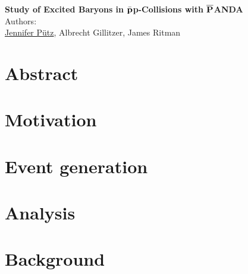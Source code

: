 \documentclass[a4paper, 11pt, twoside]{scrreprt}
\begin{document}
	\pagestyle{fancy}
	\begin{titlepage}
		\thispagestyle{empty}
		\begin{center}
			\textbf{\Huge{Study of Excited \cascade Baryons in $\bar{\textnormal{\textbf{p}}}$p-Collisions with $\overline{\textnormal{\textbf{P}}}$ANDA}}\vspace{1cm}\\
			\Large{Authors:}\vspace{0.3cm}\\
			\LARGE{\underline{Jennifer 
			      P\"{u}tz}, Albrecht Gillitzer, James Ritman\vspace{2cm}}
		\end{center}\vspace{1cm}

	\end{titlepage}
	\thispagestyle{empty}
	\chapter*{Abstract}
		
		\thispagestyle{empty}
	
	
	\setcounter{page}{0}
	\tableofcontents
	\newpage
	\setcounter{page}{1}

	\chapter{Motivation}
	
	\chapter{Event generation}
		
	
	\chapter{Analysis}
		
	
	\chapter{Background}
	
	
	
	
\end{document}
